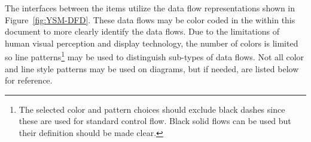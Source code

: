 The interfaces between the items utilize the data flow representations shown in Figure~\ref{fig:YSM-DFD}.
These data flows may be color coded in the \DFDs within this document to more clearly identify the data flows.
Due to the limitations of human visual perception and display technology, the number of colors is limited so line patterns\footnote{The selected color and pattern choices should exclude black dashes since these are used for standard control flow. Black solid flows can be used but their definition should be made clear.} may be used to distinguish sub-types of data flows.
Not all color and line style patterns may be used on diagrams, but if needed, are listed below for reference.

